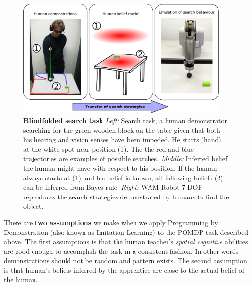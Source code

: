 \begin{figure}[h]
  \centering
  \includegraphics[width=0.95\textwidth]{./ch3-Search/Figures/Figure1.pdf}
  \caption{\textbf{Blindfolded search task} \textit{Left:}  Search task, a human demonstrator searching for the green wooden block on the table given
  that both his hearing and vision senses have been impeded. He starts (hand) at the white spot near position (1). The the red and blue trajectories 
  are examples of possible searches.
  \textit{Middle:} Inferred belief the human might have with respect to his position. If the human always starts at (1) and his belief is known, all 
  following beliefs (2) can be inferred from Bayes rule. \textit{Right:} WAM Robot 7 DOF
  reproduces the search strategies demonstrated by humans to find the object.}
 \label{fig:searching}
\end{figure} 

There are \textbf{two assumptions} we make when we apply Programming by Demonstration (also known as Imitation Learning) to the POMDP task described above. 
The first assumptions is that the human teacher's \textit{spatial cognitive} abilities are good enough to accomplish 
the task in a consistent fashion. In other words demonstrations should not be random and pattern exists. The second assumption is that human's beliefs inferred  
by the apprentice are close to the actual belief of the human. 



